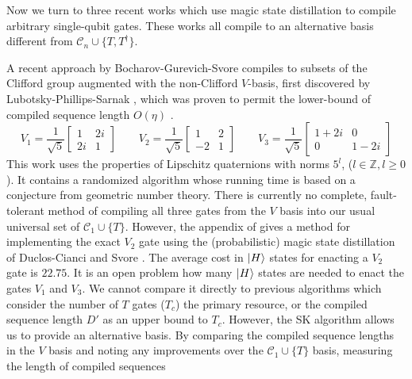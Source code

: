 Now we turn to three recent works which use magic state distillation to compile
arbitrary single-qubit gates. These works all compile to an alternative
basis different from $\mathcal{C}_n \cup \{T,T^{\dagger}\}$.

A recent approach by Bocharov-Gurevich-Svore \cite{Bocharov2013}
compiles to subsets of the Clifford group augmented with the non-Clifford
$V$-basis, first discovered by Lubotsky-Phillips-Sarnak \cite{Lubotsky1987},
which was proven to permit the lower-bound of compiled sequence length
$O(\eta)$
\cite{Harrow2002}.
%
\begin{equation}
V_1 = \frac{1}{\sqrt{5}}
\left[
\begin{array}{cc}
1  & 2i \\
2i & 1
\end{array}
\right]
\qquad
V_2 = \frac{1}{\sqrt{5}}
\left[
\begin{array}{cc}
1  & 2\\
-2 & 1
\end{array}
\right]
\qquad
V_3 = \frac{1}{\sqrt{5}}
\left[
\begin{array}{cc}
1+2i & 0 \\
   0 & 1-2i
\end{array}
\right]
\end{equation}
%
This work uses the properties of Lipschitz quaternions with norms $5^l$, ($l \in \mathbb{Z}, l \ge 0$). It
contains a randomized algorithm whose running time is based on a conjecture from geometric number theory.
There is currently no complete, fault-tolerant method of compiling all three gates from the $V$ basis into
our usual universal set of $\mathcal{C}_1 \cup \{T\}$. However, the appendix of \cite{Bocharov2013}
gives a method for implementing the exact $V_2$ gate using the (probabilistic) magic state distillation of
Duclos-Cianci and Svore \cite{DuclosCianci2012}. The average cost in $\left\vert{H}\right\rangle$
states for enacting a $V_2$ gate is $22.75$. It is an open problem how many
$\left\vert{H}\right\rangle$ states are needed to enact the gates $V_1$ and $V_3$.
We cannot compare it directly to previous algorithms which consider the number of $T$ gates ($T_c$)
the primary resource, or the compiled sequence length $D'$ as an upper bound to $T_c$.
However, the SK algorithm allows us to provide an alternative basis. By
comparing the compiled sequence lengths in the $V$ basis and noting any
improvements over the $\mathcal{C}_1 \cup \{T\}$ basis, 
measuring the length of compiled sequences 

